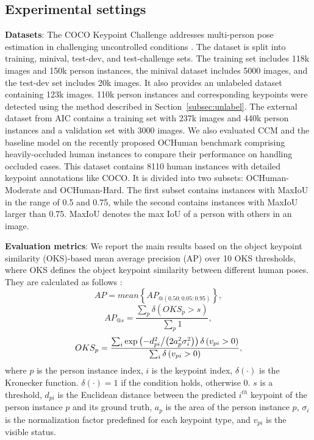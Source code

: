 \documentclass[twocolumn]{svjour3}          \smartqed  \usepackage{natbib}
\begin{document}
\subsection{Experimental settings}
\label{subsec:settings}
\textbf{Datasets}: The COCO Keypoint Challenge addresses multi-person pose estimation in challenging uncontrolled conditions \citep{lin2014microsoft}. The dataset is split into training, minival, test-dev, and test-challenge sets. The training set includes 118k images and 150k person instances, the minival dataset includes 5000 images, and the test-dev set includes 20k images. It also provides an unlabeled dataset containing 123k images. 110k person instances and corresponding keypoints were detected using the method described in Section~\ref{subsec:unlabel}. The external dataset from AIC contains a training set with 237k images and 440k person instances and a validation set with 3000 images. We also evaluated CCM and the baseline model on the recently proposed OCHuman benchmark \citep{zhang2019pose} comprising heavily-occluded human instances to compare their performance on handling occluded cases. This dataset contains 8110 human instances with detailed keypoint annotations like COCO. It is divided into two subsets: OCHuman-Moderate and OCHuman-Hard. The first subset contains instances with MaxIoU in the range of 0.5 and 0.75, while the second contains instances with MaxIoU larger than 0.75. MaxIoU denotes the max IoU of a person with others in an image.

\textbf{Evaluation metrics}: We report the main results based on the object keypoint similarity (OKS)-based mean average precision (AP) over 10 OKS thresholds, where OKS defines the object keypoint similarity between different human poses. They are calculated as follows \citep{lin2014microsoft}:
\begin{equation}
AP = mean\left\{ {AP_{@\left( {0.50:0.05:0.95} \right)}} \right\},
\label{eq:mAP}
\end{equation}
\begin{equation}
AP_{@s} = \frac{{\sum\nolimits_p {\delta \left( {OK{S_p} > s} \right)} }}{{\sum\nolimits_p 1 }},
\label{eq:AP}
\end{equation}
\begin{equation}
OK{S_p} = \frac{{\sum\nolimits_i {\exp \left( {{{ - d_{pi}^2} \mathord{\left/
 {\vphantom {{ - d_{pi}^2} {\left( {2a_p^2\sigma _i^2} \right)}}} \right.
 \kern-\nulldelimiterspace} {\left( {2a_p^2\sigma _i^2} \right)}}} \right)\delta \left( {{v_{pi}} > 0} \right)} }}{{\sum\nolimits_i {\delta \left( {{v_{pi}} > 0} \right)} }},
\label{eq:oks}
\end{equation}
where $p$ is the person instance index, $i$ is the keypoint index, $\delta \left(  \cdot  \right)$ is the Kronecker function. $\delta \left(  \cdot  \right) = 1$ if the condition holds, otherwise 0. $s$ is a threshold, $d_{pi}$ is the Euclidean distance between the predicted $i^{th}$ keypoint of the person instance $p$ and its ground truth, $a_p$ is the area of the person instance $p$, $\sigma _i$ is the normalization factor predefined for each keypoint type, and $v_{pi}$ is the visible status.
\end{document}

